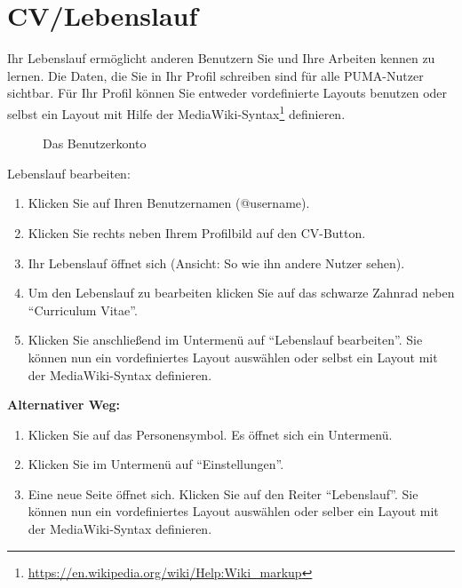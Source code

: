 \section{CV/Lebenslauf}
Ihr Lebenslauf ermöglicht anderen Benutzern Sie und Ihre Arbeiten kennen zu lernen. Die Daten, die Sie in Ihr Profil schreiben sind für alle PUMA-Nutzer sichtbar. Für Ihr Profil können Sie entweder vordefinierte Layouts benutzen oder selbst ein Layout mit Hilfe der MediaWiki-Syntax\footnote{\url{https://en.wikipedia.org/wiki/Help:Wiki_markup}} definieren. 
\begin{figure}[h!]
 \centering
 \caption{Das Benutzerkonto}
 \label{figure005}
\end{figure}  
Lebenslauf bearbeiten: 
\begin{enumerate}
    \item Klicken Sie auf Ihren Benutzernamen (@username).
    \item Klicken Sie rechts neben Ihrem Profilbild auf den CV-Button.
    \item Ihr Lebenslauf öffnet sich (Ansicht: So wie ihn andere Nutzer sehen).
    \item Um den Lebenslauf zu bearbeiten klicken Sie auf das schwarze Zahnrad neben \enquote{Curriculum Vitae}.
    \item Klicken Sie anschließend im Untermenü auf \enquote{Lebenslauf bearbeiten}. Sie können nun ein vordefiniertes Layout auswählen oder selbst ein Layout mit der MediaWiki-Syntax definieren.
\end{enumerate}
\textbf{Alternativer Weg:} 
\begin{enumerate}
    \item Klicken Sie auf das Personensymbol. Es öffnet sich ein Untermenü.
    \item Klicken Sie im Untermenü auf \enquote{Einstellungen}.
    \item Eine neue Seite öffnet sich. Klicken Sie auf den Reiter \enquote{Lebenslauf}. Sie können nun ein vordefiniertes Layout auswählen oder selber ein Layout mit der MediaWiki-Syntax definieren.
\end{enumerate}
